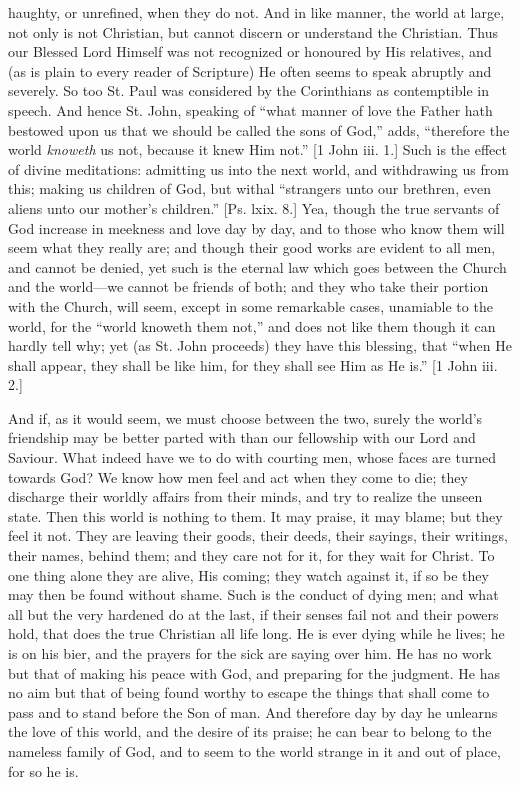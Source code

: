 haughty, or unrefined, when they do not. And in like manner, the world
at large, not only is not Christian, but cannot discern or understand
the Christian. Thus our Blessed Lord Himself was not recognized or
honoured by His relatives, and (as is plain to every reader of
Scripture) He often seems to speak abruptly and severely. So too St.
Paul was considered by the Corinthians as contemptible in speech. And
hence St. John, speaking of ``what manner of love the Father hath
bestowed upon us that we should be called the sons of God,'' adds,
``therefore the world \emph{knoweth} us not, because it knew Him
not.'' [1 John iii. 1.] Such is the effect of divine meditations:
admitting us into the next world, and withdrawing us from this; making
us children of God, but withal ``strangers unto our brethren, even
aliens unto our mother's children.'' [Ps. lxix. 8.] Yea, though
the true servants of God increase in meekness and love day by day, and
to those who know them will seem what they really are; and though
their good works are evident to all men, and cannot be denied, yet
such is the eternal law which goes between the Church and the world—we
cannot be friends of both; and they who take their portion with the
Church, will seem, except in some remarkable cases, unamiable to the
world, for the ``world knoweth them not,'' and does not like
them though it can hardly tell why; yet (as St. John proceeds) they
have this blessing, that ``when He shall appear, they shall be
like him, for they shall see Him as He is.'' [1 John iii. 2.]

And if, as it would seem, we must choose between the two, surely
the world's friendship may be better parted with than our fellowship
with our Lord and Saviour. What indeed have we to do with courting
men, whose faces are turned towards God? We know how men feel and act
when they come to die; they discharge their worldly affairs from their
minds, and try to realize the unseen state. Then this world is nothing
to them. It may praise, it may blame; but they feel it not. They are
leaving their goods, their deeds, their sayings, their writings, their
names, behind them; and they care not for it, for they wait for
Christ. To one thing alone they are alive, His coming; they watch
against it, if so be they may then be found without shame. Such is the
conduct of dying men; and what all but the very hardened do at the
last, if their senses fail not and their powers hold, that does the
true Christian all life long. He is ever dying while he lives; he is
on his bier, and the prayers for the sick are saying over him. He has
no work but that of making his peace with God, and preparing for the
judgment. He has no aim but that of being found worthy to escape the
things that shall come to pass and to stand before the Son of man. And
therefore day by day he unlearns the love of this world, and the
desire of its praise; he can bear to belong to the nameless family of
God, and to seem to the world strange in it and out of place, for so
he is.

